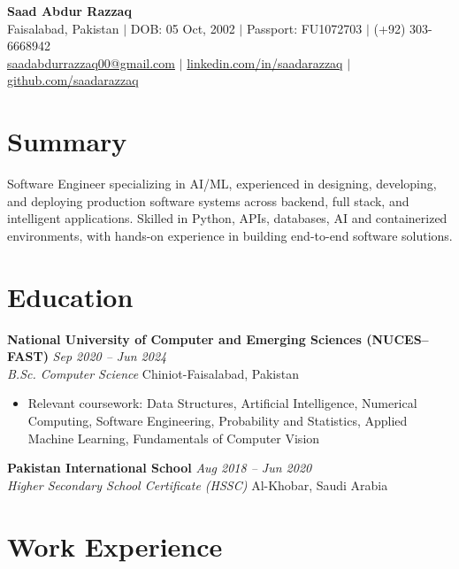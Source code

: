 \documentclass[11pt,a4paper]{article}
\newcommand{\entry}[4]{%
  \noindent\textbf{#1} \hfill \textit{#2}\\
  \textit{#3} \hfill #4\\[2pt]
}
\begin{document}
\begin{center}
    {\LARGE \bfseries Saad Abdur Razzaq}\\[4pt]
    Faisalabad, Pakistan \quad $\vert$ \quad DOB: 05 Oct, 2002 \quad $\vert$ \quad
    Passport: FU1072703 \quad $\vert$ \quad (+92) 303-6668942\\[2pt]
    \href{mailto:saadabdurrazzaq00@gmail.com}{saadabdurrazzaq00@gmail.com} \quad $\vert$ \quad
    \href{https://linkedin.com/in/saadarazzaq/}{linkedin.com/in/saadarazzaq} \quad $\vert$ \quad
    \href{https://github.com/saadarazzaq}{github.com/saadarazzaq}
\end{center}

\section*{Summary}
Software Engineer specializing in AI/ML, experienced in designing, developing, and deploying production software systems across backend, full stack, and intelligent applications. Skilled in Python, APIs, databases, AI and containerized environments, with hands-on experience in building end-to-end software solutions.

\section*{Education}

\entry{National University of Computer and Emerging Sciences (NUCES--FAST)}{Sep 2020 -- Jun 2024}
      {B.Sc. Computer Science}{Chiniot-Faisalabad, Pakistan}
\begin{itemize}
    \item Relevant coursework: Data Structures, Artificial Intelligence, Numerical Computing,
          Software Engineering, Probability and Statistics, Applied Machine Learning,
          Fundamentals of Computer Vision
\end{itemize}

\vspace{4pt}
\entry{Pakistan International School}{Aug 2018 -- Jun 2020}
      {Higher Secondary School Certificate (HSSC)}{Al-Khobar, Saudi Arabia}


\section*{Work Experience}
\end{document}
